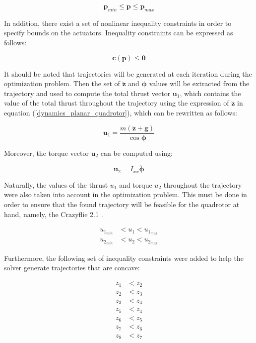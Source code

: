 \documentclass{thesisreport}
\begin{document}
\begin{equation}
	\bm{p}_{min} \leq \bm{p} \leq \bm{p}_{max}
\end{equation}

In addition, there exist a set of nonlinear inequality  constraints in order to specify bounds on the actuators. Inequality constraints can be expressed as follows:

\begin{equation}
	\bm{c}(\bm{p}) \leq \bm{0}
\end{equation}

It should be noted that trajectories will be generated at each iteration during the optimization problem. Then the set of $\ddot{\bm{z}}$ and $\bm{\phi}$ values will be extracted from the trajectory and used to compute the total thrust vector $\bm{u}_1$, which contains the value of the total thrust throughout the trajectory using the expression of $\ddot{\bm{z}}$ in equation (\ref{dynamics_planar_quadrotor}), which can be rewritten as follows:  

\begin{equation}
	\bm{u}_1 = \frac{m(\ddot{\bm{z}} + \bm{g})}{\cos \bm{\phi}}
\end{equation}

Moreover, the torque vector $\bm{u}_2$ can be computed using:

\begin{equation}
	\bm{u}_2 = I_{xx} \ddot{\bm{\phi}}
\end{equation}

Naturally, the values of the thrust $u_1$ and torque $u_2$ throughout the trajectory were also taken into account in the optimization problem. This must be done in order to ensure that the found trajectory will be feasible for the quadrotor at hand, namely, the Crazyflie 2.1 .

\begin{align}
	u_{1_{min}} &< u_1 < u_{1_{max}} \\
	u_{2_{min}} &< u_2 < u_{2_{max}} 
\end{align}

Furthermore, the following set of inequality constraints were added to help the solver generate trajectories that are concave:

\begin{align}
	z_1 &< z_2 \\
	z_2 &< z_3 \\
	z_3 &< z_4 \\
	z_5 &< z_4 \\
	z_6 &< z_5 \\
	z_7 &< z_6 \\
	z_8 &< z_7
\end{align}
\end{document}

